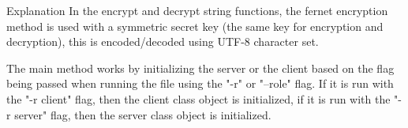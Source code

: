 \documentclass[titlepage]{article}
\begin{document}
\begin{section}{Explanation}
        In the encrypt and decrypt string functions, the fernet encryption method is used with a symmetric secret key (the same key for encryption and decryption), this is encoded/decoded using UTF-8 character set.

        The main method works by initializing the server or the client based on the flag being passed when running the file using the "-r" or "--role" flag. If it is run with the "-r client" flag, then the client class object is initialized, if it is run with the "-r server" flag, then the server class object is initialized.
    \end{section}
\end{document}
